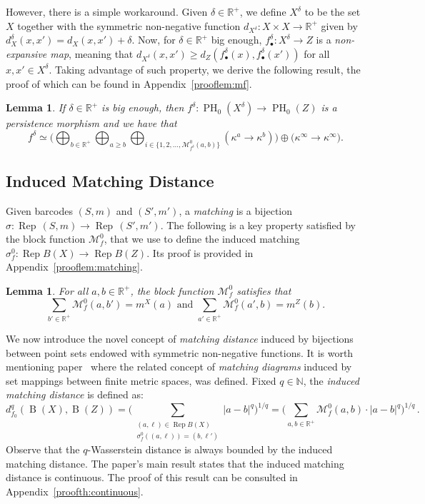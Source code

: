 \documentclass{article}
\DeclareMathOperator{\PH}{PH}
\DeclareMathOperator{\B}{B}
\DeclareMathOperator{\Rep}{Rep}
\newcommand{\R}{\mathbb{R}^+}
\newcommand{\N}{\mathbb{N}}
\newcommand{\cM}{\mathcal{M}}
\newcommand{\scst}{\scriptscriptstyle}
\newcommand{\cMXZ}{\cM_f^0}
\newcommand{\dM}{d_{f_0}}
\newcommand{\dX}{d_{\scst X}}
\newcommand{\dZ}{d_{\scst Z}}
\newcommand{\mZ}{m^{\scst Z}}
\newcommand{\mX}{m^{\scst X}}
\newcommand{\fbullet}{f_{\bullet}}
\newcommand{\kinfty}{\kappa^\infty}
\newcommand{\Xdelta}{X^{\delta}}
\newtheorem{lemma}[theorem]{Lemma}
\begin{document}
However,
there is a simple workaround.
Given $\delta\in\R$, we define $\Xdelta$ to be
the set $X$ together with the symmetric non-negative function $d_{\Xdelta}:X\times X\to\R$ given by $\dX^{\delta} (x,x')=\dX(x,x')+\delta$.
Now, for
$\delta \in \R$ big enough, $\fbullet^{\delta}:\Xdelta\to Z$ is a \emph{non-expansive map}, meaning that
$d_{\Xdelta}(x,x')\geq \dZ(\fbullet^{\delta}(x),\fbullet^{\delta}(x'))$ for all $x,x'\in \Xdelta$. 
Taking advantage of such property,  we derive the following result, the proof of which can be found in Appendix~\ref{prooflem:mf}.

\begin{lemma}\label{lem:mf}
  If $\delta\in\R$ is big enough, then 
  $f^{\delta}
  \colon \PH_0(\Xdelta)\to \PH_0(Z)$ is a persistence morphism and we have that
\[
  f^{\delta}
   \simeq 
    \mbox{$\bigg(
        \bigoplus_{ b \in \R} \bigoplus_{a\geq b} 
        \bigoplus_{ i\in \{1,2,\dots,\cM_{f^{\delta}}^0(a,b)\}} 
        (\kappa^{a} \rightarrow \kappa^{b})\bigg) 
       \oplus \big(\kinfty\rightarrow \kinfty\big)$.}
        \]
\end{lemma}

\subsection{Induced Matching Distance}

Given barcodes $(S, m)$ and $(S', m')$, a \emph{matching} is a bijection
$
 \sigma\colon\Rep\, (S,m) \rightarrow \Rep\, (S', m')
 $. 
The following is a key property satisfied by the block function $\cMXZ$, that we use to define the induced matching $\sigma_f^0\colon\Rep B(X)\to \Rep B(Z)$.
Its proof is provided in Appendix~\ref{prooflem:matching}.
 
\begin{lemma}\label{lem:matching}
For all $a,b\in\R$, the block function
$\cMXZ$ 
satisfies that 
\[\mbox{$\sum_{b' \in \R} \cM^0_f(a,b') = \mX(a)$ and $\sum_{a' \in \R} \cMXZ(a',b) = \mZ(b)$.}\]
 \end{lemma}

We now introduce the novel concept of \emph{matching distance} induced by bijections between point sets endowed with symmetric non-negative functions. It is worth mentioning paper~\cite{torras} where the related concept of \emph{matching diagrams} induced by set mappings between finite metric spaces,  was defined. 
Fixed $q\in \N$,  the {\it induced matching distance} is defined as:
\[
\dM^q(\B(X),\B(Z))=
\Bigg(
\sum_{\substack{
(a,\ell) \in \Rep B(X) \\
\sigma_f^0((a,\ell))=(b,\ell')
}}
|a-b|^q\Bigg)^{1/q}
=
\Bigg(\sum_{a,b \in \R}
\cMXZ (a,b) \cdot 
|a-b|^q
\Bigg)
^{1/q}
\,.
\]
Observe that  the
$q$-Wasserstein distance \cite{cohen2010lipschitz}  is always bounded by the induced matching distance. 
The paper's main result states that the induced matching distance is continuous. The proof of this result can be consulted in Appendix~\ref{proofth:continuous}.
\end{document}
